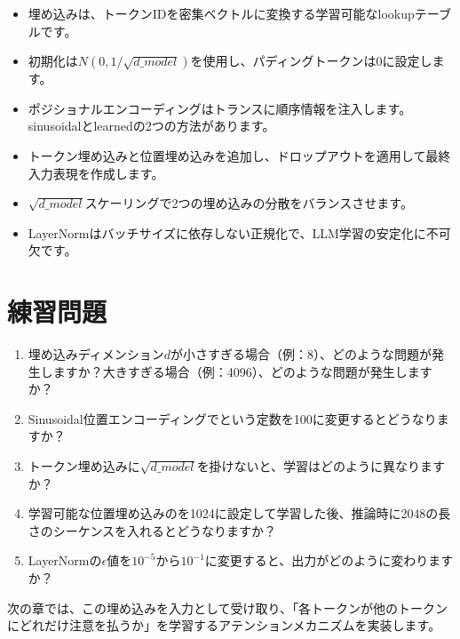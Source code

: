 \begin{itemize}
\item 埋め込みは、トークンIDを密集ベクトルに変換する学習可能なlookupテーブルです。
\item 初期化は$N(0, 1/\sqrt{d\_{model}})$を使用し、パディングトークンは0に設定します。
\item ポジショナルエンコーディングはトランスに順序情報を注入します。 sinusoidalとlearnedの2つの方法があります。
\item トークン埋め込みと位置埋め込みを追加し、ドロップアウトを適用して最終入力表現を作成します。
\item $\sqrt{d\_{model}}$スケーリングで2つの埋め込みの分散をバランスさせます。
\item LayerNormはバッチサイズに依存しない正規化で、LLM学習の安定化に不可欠です。
\end{itemize}

\section{練習問題}

\begin{enumerate}
\item 埋め込みディメンション$d$が小さすぎる場合（例：8）、どのような問題が発生しますか？大きすぎる場合（例：4096）、どのような問題が発生しますか？
\item Sinusoidal位置エンコーディングでという定数を100に変更するとどうなりますか？
\item トークン埋め込みに$\sqrt{d\_{model}}$を掛けないと、学習はどのように異なりますか？
\item 学習可能な位置埋め込みのを1024に設定して学習した後、推論時に2048の長さのシーケンスを入れるとどうなりますか？
\item LayerNormの$\epsilon$値を$10^{-5}$から$10^{-1}$に変更すると、出力がどのように変わりますか？
\end{enumerate}

次の章では、この埋め込みを入力として受け取り、「各トークンが他のトークンにどれだけ注意を払うか」を学習するアテンションメカニズムを実装します。
